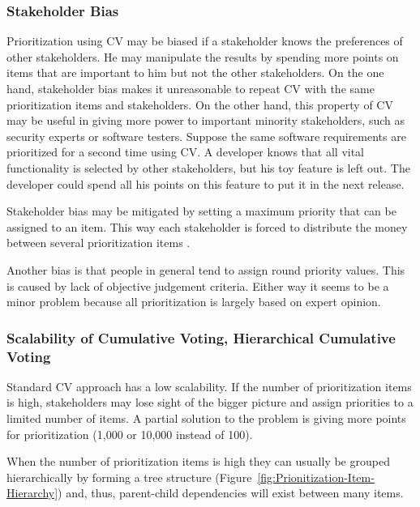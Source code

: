 \subsubsection{Stakeholder Bias\label{sub:Stakeholder-Bias}}

Prioritization using CV may be biased if a stakeholder knows the preferences
of other stakeholders. He may manipulate the results by spending more
points on items that are important to him but not the other stakeholders.
On the one hand, stakeholder bias makes it unreasonable to repeat CV
with the same prioritization items and stakeholders. On the other hand,
this property of CV may be useful in giving more power to important
minority stakeholders, such as security experts or software testers.
Suppose the same software requirements are prioritized for a second time using
CV. A developer knows that all vital functionality is selected by
other stakeholders, but his toy feature is left out. The developer
could spend all his points on this feature to put it in the next release. 

Stakeholder bias may be mitigated by setting a maximum priority that
can be assigned to an item. This way each stakeholder is forced to
distribute the money between several prioritization items \citep{Berander2006a}.

Another bias is that people in general tend to assign round priority
values. This is caused by lack of objective judgement criteria. Either
way it seems to be a minor problem because all prioritization is largely
based on expert opinion.


\subsubsection{Scalability of Cumulative Voting, Hierarchical Cumulative Voting\label{hcv}}

Standard CV approach has a low scalability. If the number of prioritization items
is high, stakeholders may lose sight of the bigger picture and assign priorities to a
limited number of items. A partial solution to the problem is giving
more points for prioritization (1,000 or 10,000 instead of 100).

When the number of prioritization items is high they can usually 
be grouped hierarchically by forming a tree structure (Figure~\ref{fig:Prionitization-Item-Hierarchy}) and, thus, parent-child dependencies will exist between many items.%


